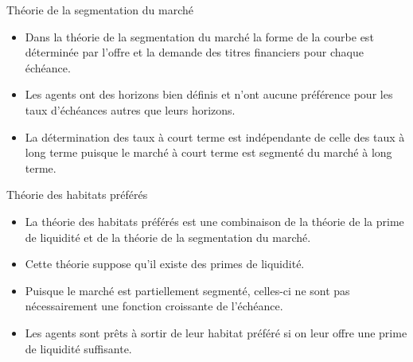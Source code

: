 \documentclass{beamer}
\begin{document}
\begin{frame}{Théorie de la segmentation du marché}
\begin{itemize}
\item Dans la théorie de la segmentation du marché la forme de la courbe est déterminée par l’offre et la demande des titres financiers pour chaque échéance.  
\item Les agents ont des horizons bien définis et n’ont aucune préférence pour les taux d’échéances autres que leurs horizons. 
\item La détermination des taux à court terme est indépendante de celle des taux à long terme puisque le marché à court terme est segmenté du marché à long terme.
\end{itemize}
\end{frame}
\begin{frame}{Théorie des habitats préférés}
\begin{itemize}
\item La théorie des habitats préférés est une combinaison de la théorie de la prime de liquidité et de la théorie de la segmentation du marché. 
\item Cette théorie suppose qu'il existe des primes de liquidité.
\item Puisque le marché est partiellement segmenté,  celles-ci ne sont pas nécessairement une fonction croissante de l’échéance.
\item Les agents sont prêts à sortir de leur habitat préféré si on leur offre une prime de liquidité suffisante.
\end{itemize}
\end{frame}
\end{document}
